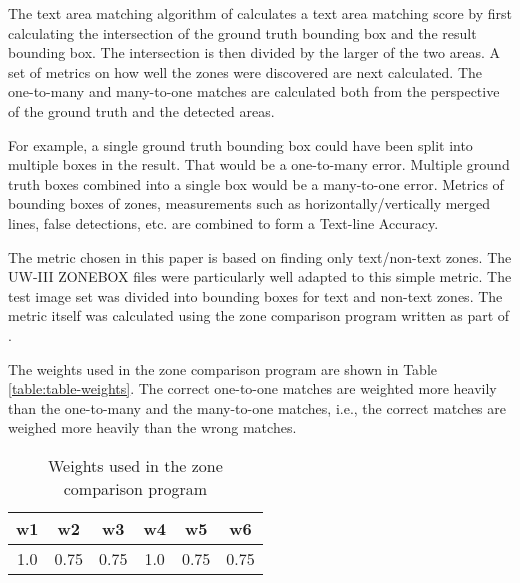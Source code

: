 \documentclass[conference]{IEEEtran}
\begin{document}
The text area matching algorithm of \cite{phillips1999empirical} calculates a
text area matching score by first calculating the intersection of the ground
truth bounding box and the result bounding box. The intersection is
then divided by the larger of the two areas. A set of metrics on how well the
zones were discovered are next calculated.  The one-to-many and many-to-one
matches are calculated both from the perspective of the ground truth and the
detected areas. 

For example, a single ground truth bounding box could have been split into
multiple boxes in the result. That would be a one-to-many error. Multiple
ground truth boxes combined into a single box would be a many-to-one error.
Metrics of bounding boxes of zones, measurements such as
horizontally/vertically merged lines, false detections, etc. are combined to
form a Text-line Accuracy.  

The metric chosen in this paper is based on finding only text/non-text zones.
The UW-III ZONEBOX files were particularly well adapted to this simple
metric. The \cite{winder2010extending} test image set was divided into bounding
boxes for text and non-text zones.  The metric itself was calculated using the
zone comparison program written as part of \cite{winder2010extending}. 


The weights used in the zone comparison program are shown in Table
\ref{table:table-weights}. The correct one-to-one matches are weighted more
heavily than the one-to-many and the many-to-one matches, i.e., the correct
matches are weighed more heavily than the wrong matches.

\begin{table}
\begin{center}
\caption{Weights used in the zone comparison program}
\label{table:table-weights}
\label{table-weights}
\begin{tabular}{|c|c|c|c|c|c|}
\hline
  w1 & w2 & w3 & w4 & w5 & w6 \\
 \hline
  1.0  & 0.75 & 0.75 & 1.0 & 0.75 & 0.75 \\
\hline
\end{tabular}
\end{center}
\end{table}
\end{document}
